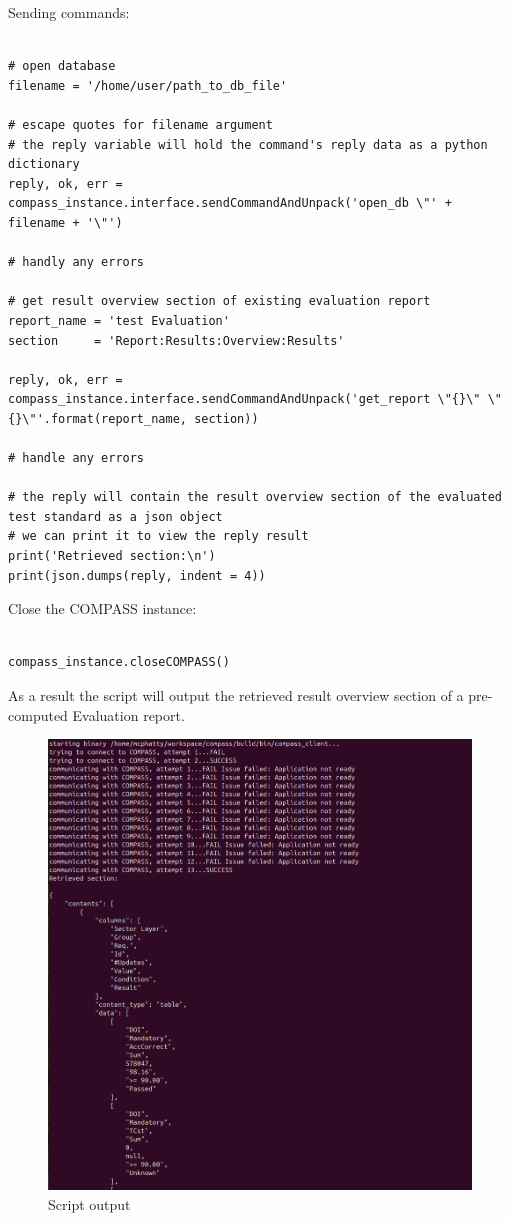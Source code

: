 Sending commands:

\begin{lstlisting}[basicstyle=\tiny\ttfamily]

# open database
filename = '/home/user/path_to_db_file'

# escape quotes for filename argument
# the reply variable will hold the command's reply data as a python dictionary
reply, ok, err = compass_instance.interface.sendCommandAndUnpack('open_db \"' + filename + '\"')

# handly any errors 

# get result overview section of existing evaluation report
report_name = 'test Evaluation'
section     = 'Report:Results:Overview:Results'

reply, ok, err = compass_instance.interface.sendCommandAndUnpack('get_report \"{}\" \"{}\"'.format(report_name, section))

# handle any errors 

# the reply will contain the result overview section of the evaluated test standard as a json object
# we can print it to view the reply result
print('Retrieved section:\n')
print(json.dumps(reply, indent = 4))

\end{lstlisting}

Close the COMPASS instance:

\begin{lstlisting}[basicstyle=\tiny\ttfamily]

compass_instance.closeCOMPASS()

\end{lstlisting}

As a result the script will output the retrieved result overview section of a pre-computed Evaluation report.

\begin{figure}[H]
    \hspace*{-2.5cm}
    \includegraphics[width=18cm,frame]{figures/script_result.png}
  \caption{Script output}
\end{figure}
